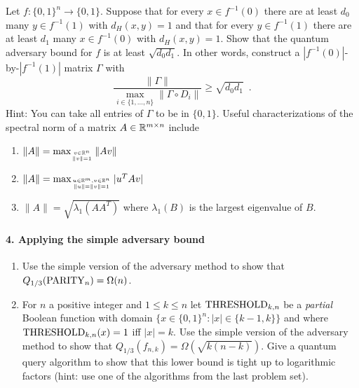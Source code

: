 Let $f : \{0,1\}^n \rightarrow \{0,1\}$.  Suppose that for every $x \in f^{-1}(0)$ there are at least $d_0$ many $y \in f^{-1}(1)$ 
with $d_H(x,y) = 1$ and that for every $y \in f^{-1}(1)$ there are at least $d_1$ many $x \in f^{-1}(0)$ with $d_H(x,y) = 1$.  
Show that the quantum adversary bound for $f$ is at least $\sqrt{d_0 d_1}$.  In other words, construct a $|f^{-1}(0)|$-by-$|f^{-1}(1)|$ 
matrix $\Gamma$ with 
\[
\frac{\|\Gamma\|}{\max_{i \in \{1, \ldots, n\} } \|\Gamma \circ D_i\|} \ge \sqrt{d_0 d_1} \enspace .
\]
Hint: You can take all entries of $\Gamma$ to be in $\{0,1\}$.  Useful characterizations of the spectral norm of a matrix $A \in \mathbb{R}^{m \times n}$ include
\begin{enumerate}
  \item $\| A \| = \max_{v \in \mathbb{R}^n \atop \|v\| = 1} \|Av \|$
  \item $\| A\| = \max_{u \in \mathbb{R}^m, v \in \mathbb{R}^n \atop \|u\| = \|v\| = 1} |u^T A v|$
  \item $\| A \| = \sqrt{ \lambda_1(AA^T)}$ where $\lambda_1(B)$ is the largest eigenvalue of $B$.
\end{enumerate}

\paragraph*{4. Applying the simple adversary bound}
\begin{enumerate}
  \item Use the simple version of the adversary method to show that $Q_{1/3}(\mathrm{PARITY}_n) = \Omega(n)$.
  \item For $n$ a positive integer and $1 \le k \le n$ let $\mathrm{THRESHOLD}_{k,n}$ be a \emph{partial} Boolean function with domain $\{x \in \{0,1\}^n : |x| \in \{k-1, k\}\}$ 
  and where $\mathrm{THRESHOLD}_{k,n}(x) = 1$ iff $|x| = k$.  Use the simple version of the adversary method to show that $Q_{1/3}(f_{n,k}) = \Omega(\sqrt{k(n-k)})$.  
  Give a quantum query algorithm to show that this lower bound is tight up to logarithmic factors (hint: use one of the algorithms from the last problem set).  
\end{enumerate}

